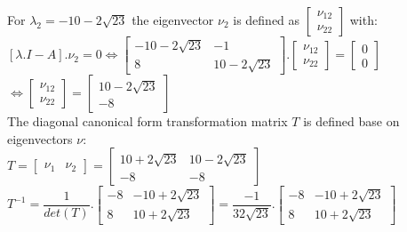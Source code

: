 \documentclass[14pt,a4paper]{article}
\begin{document}
\begin{enumerate}
		For $\lambda_2 = -10 - 2\sqrt{23}$ the eigenvector $\nu_2$ is defined as $\begin{bmatrix}\nu_{12}\\ \nu_{22} \end{bmatrix}$ with: \\
			$[\lambda .I - A].\nu_2 = 0 \Leftrightarrow \begin{bmatrix} -10 - 2\sqrt{23} & -1 \\ 8& 10-2\sqrt{23} \end{bmatrix} .\begin{bmatrix}\nu_{12}\\ \nu_{22} \end{bmatrix} = \begin{bmatrix} 0\\0 \end{bmatrix} $ \\
			$ \Leftrightarrow \begin{bmatrix} \nu_{12} \\\nu_{22}	\end{bmatrix} = \begin{bmatrix} 10-2\sqrt{23} \\-8	\end{bmatrix}$ \\
	
		The diagonal canonical form transformation matrix $T$ is defined base on eigenvectors $\nu$: \\
			$T = \begin{bmatrix} \nu_1 & \nu_2	\end{bmatrix} = \begin{bmatrix} 10+2\sqrt{23} & 10 - 2\sqrt{23} \\ -8 & -8 \end{bmatrix} $\\
			$T^{-1} = \dfrac{1}{det(T)}.\begin{bmatrix} -8 & -10 + 2\sqrt{23} \\ 8 & 10+2\sqrt{23} \end{bmatrix} = \dfrac{-1}{32\sqrt{23}}.\begin{bmatrix} -8 & -10 + 2\sqrt{23} \\ 8 & 10+2\sqrt{23} \end{bmatrix} $\\
	

\end{enumerate}
\end{document}
